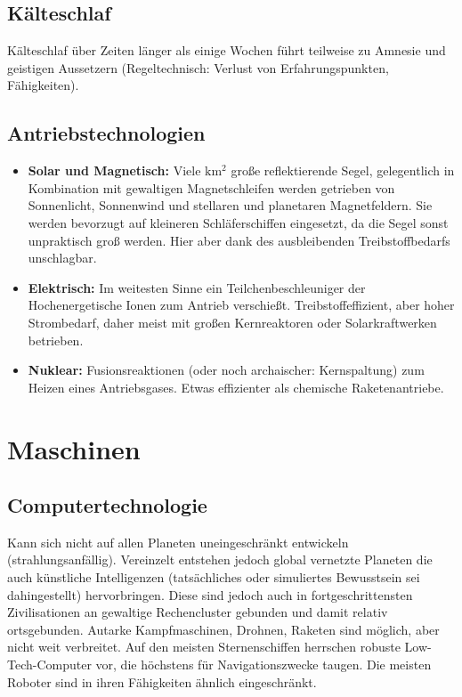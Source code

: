\documentclass[10pt,a4paper]{report}
\begin{document}
\subsection*{Kälteschlaf}
Kälteschlaf über Zeiten länger als einige Wochen führt teilweise zu Amnesie und geistigen Aussetzern (Regeltechnisch: Verlust von Erfahrungspunkten, Fähigkeiten).
\subsection*{Antriebstechnologien}
\begin{itemize}
\item \textbf{Solar und Magnetisch:} Viele $\mathrm{km^2}$ große reflektierende Segel, gelegentlich in Kombination mit gewaltigen Magnetschleifen werden getrieben von Sonnenlicht, Sonnenwind und stellaren und planetaren Magnetfeldern. Sie werden bevorzugt auf kleineren Schläferschiffen eingesetzt, da die Segel sonst unpraktisch groß werden. Hier aber dank des ausbleibenden Treibstoffbedarfs unschlagbar.
\item \textbf{Elektrisch:} Im weitesten Sinne ein Teilchenbeschleuniger der Hochenergetische Ionen zum Antrieb verschießt. Treibstoffeffizient, aber hoher Strom\-bedarf, daher meist mit großen Kernreaktoren oder Solarkraftwerken betrieben.
\item \textbf{Nuklear:} Fusionsreaktionen (oder noch archaischer: Kernspaltung) zum Heizen eines Antriebsgases. Etwas effizienter als chemische Raketen\-antriebe.
\end{itemize}

\section{Maschinen}
\subsection*{Computertechnologie}
Kann sich nicht auf allen Planeten uneingeschränkt entwickeln (strahlungsanfällig). Vereinzelt entstehen jedoch global vernetzte Planeten die auch künstliche Intelligenzen (tatsächliches oder simuliertes Bewusstsein sei dahingestellt) hervorbringen. Diese sind jedoch auch in fortgeschrittensten Zivilisationen an gewaltige Rechencluster gebunden und damit relativ ortsgebunden.
Autarke Kampfmaschinen, Drohnen, Raketen sind möglich, aber nicht weit verbreitet. Auf den meisten Sternenschiffen herrschen robuste Low-Tech-Computer vor, die höchstens für Navigationszwecke taugen. Die meisten Roboter sind in ihren Fähigkeiten ähnlich eingeschränkt.
\end{document}
